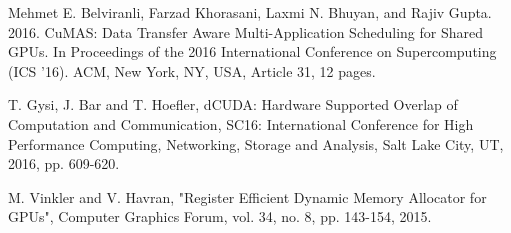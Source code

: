 \documentclass[conference]{IEEEtran}
\begin{document}
\begin{thebibliography}{1}
Mehmet E. Belviranli, Farzad Khorasani, Laxmi N. Bhuyan, and Rajiv Gupta. 2016. CuMAS: Data Transfer Aware Multi-Application Scheduling for Shared GPUs. In Proceedings of the 2016 International Conference on Supercomputing (ICS '16). ACM, New York, NY, USA, Article 31, 12 pages. 

T. Gysi, J. Bar and T. Hoefler, 
dCUDA: Hardware Supported Overlap of Computation and Communication, 
SC16: International Conference for High Performance Computing, Networking, Storage and Analysis, Salt Lake City, UT, 2016, pp. 609-620.

M. Vinkler and V. Havran, "Register Efficient Dynamic Memory Allocator for GPUs", Computer Graphics Forum, vol. 34, no. 8, pp. 143-154, 2015.

\end{thebibliography}
\end{document}
